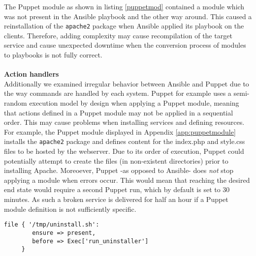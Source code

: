 \noindent
The Puppet module as shown in listing \ref{puppetmod} contained a module which was not present in the Ansible playbook and the other way around. This caused a reinstallation of the \texttt{apache2} package when Ansible applied its playbook on the clients. Therefore, adding complexity may cause recompilation of the target service and cause unexpected downtime when the conversion process of modules to playbooks is not fully correct.
\\\\
\noindent
\textbf{Action handlers}\\
Additionally we examined irregular behavior between Ansible and Puppet due to the way commands are handled by each system. Puppet for example uses a semi-random execution model by design when applying a Puppet module, meaning that actions defined in a Puppet module may not be applied in a sequential order. This may cause problems when installing services and defining resources. For example, the Puppet module displayed in Appendix \ref{app:puppetmodule} installs the \texttt{apache2} package and defines content for the index.php and style.css files to be hosted by the webserver. Due to its order of execution, Puppet could potentially attempt to create the files (in non-existent directories) prior to installing Apache. Moreoever, Puppet -as opposed to Ansible- does \textit{not} stop applying a module when errors occur. This would mean that reaching the desired end state would require a second Puppet run, which by default is set to 30 minutes. As such a broken service is delivered for half an hour if a Puppet module definition is not sufficiently specific. 
\\
\begin{lstlisting}[caption={Code order regulation in Puppet},label=seqorder]
     file { '/tmp/uninstall.sh': 
        ensure => present,
        before => Exec['run_uninstaller'] 
     }
\end{lstlisting}

